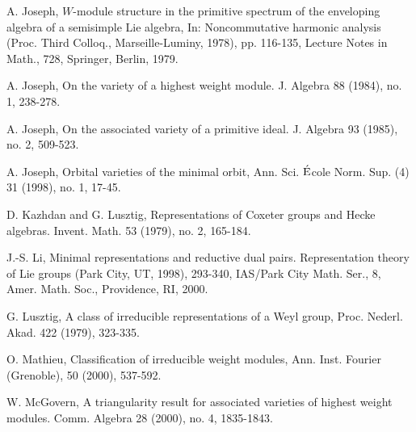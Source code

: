 \documentclass{amsart}[12pt]
\numberwithin{equation}{section}
\begin{document}
\begin{thebibliography}{99}
A. Joseph, $W$-module structure in the primitive spectrum of the enveloping algebra of a semisimple Lie algebra, In: Noncommutative harmonic analysis (Proc. Third Colloq., Marseille-Luminy, 1978), pp. 116-135, Lecture Notes in Math., 728, Springer, Berlin, 1979.


A. Joseph, On the variety of a highest weight module. J. Algebra 88 (1984), no. 1, 238-278.


A. Joseph, On the associated variety of a primitive ideal. J. Algebra 93 (1985), no. 2, 509-523.

A. Joseph, Orbital varieties of the minimal orbit, Ann. Sci. $\rm{\acute{E}}$cole Norm.
Sup. (4) 31 (1998), no. 1, 17-45.


D. Kazhdan and G. Lusztig,  Representations of Coxeter groups and Hecke algebras. Invent. Math. 53 (1979), no. 2, 165-184.


J.-S. Li, Minimal representations and reductive dual pairs. Representation theory of Lie groups (Park City, UT, 1998), 293-340, IAS/Park City Math. Ser., 8, Amer. Math. Soc., Providence, RI, 2000.

%


G. Lusztig, A class of irreducible representations of a Weyl group, Proc. Nederl.
Akad. 422 (1979), 323-335.

O. Mathieu,   Classification of irreducible weight modules,   Ann. Inst. Fourier (Grenoble),  50  (2000), 537-592.




 W. McGovern, A triangularity result for associated varieties of highest weight modules. Comm. Algebra 28 (2000), no. 4, 1835-1843.


\end{thebibliography}
\end{document}
